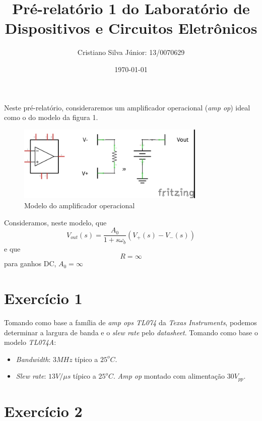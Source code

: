 \documentclass[12pt, a4paper, twoside]{article}
\begin{document}
\title{Pré-relatório 1 do Laboratório de Dispositivos e Circuitos Eletrônicos}
\author{Cristiano Silva Júnior: 13/0070629}
\date{\today}
\maketitle

Neste pré-relatório, consideraremos um amplificador operacional (\textit{amp op}) ideal como o do modelo da figura 1.

\begin{figure}
    \centering
    \includegraphics[width=0.8\textwidth]{figs/ex0.jpg}
    \caption{Modelo do amplificador operacional}
\end{figure}

Consideramos, neste modelo, que
$$ V_{out}(s) = \frac{A_0}{1 + s \omega_b} (V_+(s) - V_-(s)) $$
e que
$$ R = \infty $$
para ganhos DC, $A_0=\infty$

\section{Exercício 1}

Tomando como base a família de \textit{amp ops TL074} da \textit{Texas Instruments}, podemos determinar a largura de banda e o \textit{slew rate} pelo \textit{datasheet}. Tomando como base o modelo \textit{TL074A}:

\begin{itemize}
    \item \textit{Bandwidth}: $3MHz$ típico a $25^oC$.
    \item \textit{Slew rate}: $13 V/\mu s$ típico a $25^oC$. \textit{Amp op} montado com alimentação $30V_{pp}$.
\end{itemize}

\section{Exercício 2}
\end{document}
